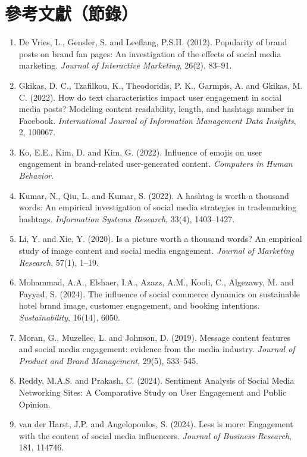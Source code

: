 \documentclass[12pt,a4paper]{ctexart}
\begin{document}
\section{參考文獻（節錄）}
\begin{enumerate}
    \item De Vries, L., Gensler, S. and Leeflang, P.S.H. (2012). Popularity of brand posts on brand fan pages: An investigation of the effects of social media marketing. \textit{Journal of Interactive Marketing}, 26(2), 83--91.
    \item Gkikas, D. C., Tzafilkou, K., Theodoridis, P. K., Garmpis, A. and Gkikas, M. C. (2022). How do text characteristics impact user engagement in social media posts? Modeling content readability, length, and hashtags number in Facebook. \textit{International Journal of Information Management Data Insights}, 2, 100067.
    \item Ko, E.E., Kim, D. and Kim, G. (2022). Influence of emojis on user engagement in brand-related user-generated content. \textit{Computers in Human Behavior}.
    \item Kumar, N., Qiu, L. and Kumar, S. (2022). A hashtag is worth a thousand words: An empirical investigation of social media strategies in trademarking hashtags. \textit{Information Systems Research}, 33(4), 1403--1427.
    \item Li, Y. and Xie, Y. (2020). Is a picture worth a thousand words? An empirical study of image content and social media engagement. \textit{Journal of Marketing Research}, 57(1), 1--19.
    \item Mohammad, A.A., Elshaer, I.A., Azazz, A.M., Kooli, C., Algezawy, M. and Fayyad, S. (2024). The influence of social commerce dynamics on sustainable hotel brand image, customer engagement, and booking intentions. \textit{Sustainability}, 16(14), 6050.
    \item Moran, G., Muzellec, L. and Johnson, D. (2019). Message content features and social media engagement: evidence from the media industry. \textit{Journal of Product and Brand Management}, 29(5), 533--545.
    \item Reddy, M.A.S. and Prakash, C. (2024). Sentiment Analysis of Social Media Networking Sites: A Comparative Study on User Engagement and Public Opinion.
    \item van der Harst, J.P. and Angelopoulos, S. (2024). Less is more: Engagement with the content of social media influencers. \textit{Journal of Business Research}, 181, 114746.
\end{enumerate}
\end{document}
